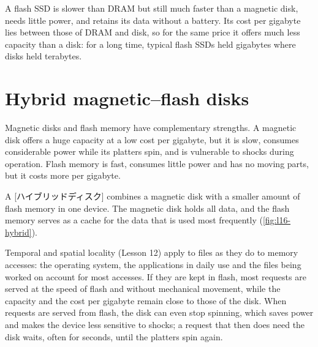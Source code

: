 \documentclass[../main.tex]{subfiles}
\begin{document}

A flash SSD is slower than DRAM but still much faster than a magnetic disk,
needs little power, and retains its data without a battery.  Its cost per
gigabyte lies between those of DRAM and disk, so for the same price it
offers much less capacity than a disk: for a long time, typical flash SSDs
held gigabytes where disks held terabytes.

\section{Hybrid magnetic--flash disks}
\label{sec:l16-hybrid}

Magnetic disks and flash memory have complementary
strengths.  A magnetic disk offers a huge
capacity at a low cost per gigabyte, but it is slow, consumes considerable
power while its platters spin, and is vulnerable to shocks during operation.
Flash memory is fast, consumes little power and has no moving parts, but it
costs more per gigabyte.

\begin{definition}
  A [ハイブリッドディスク] combines a magnetic disk with a
  smaller amount of flash memory in one device.  The magnetic disk holds all
  data, and the flash memory serves as a cache for the data that is used most
  frequently (\cref{fig:l16-hybrid}).
\end{definition}

Temporal and spatial locality (Lesson 12) apply to files as they do to memory
accesses: the operating system, the applications in daily use and the files
being worked on account for most accesses.  If they are kept in flash, most
requests are served at the speed of flash and without mechanical movement,
while the capacity and the cost per gigabyte remain close to those of the
disk.  When requests are served from flash, the disk can even stop spinning,
which saves power and makes the device less sensitive to shocks; a request
that then does need the disk waits, often for seconds, until the platters
spin again.

\begin{marginfigure}
  
  \caption{A hybrid disk.  Most requests are served by the flash cache.}
  \label{fig:l16-hybrid}
\end{marginfigure}
\end{document}
